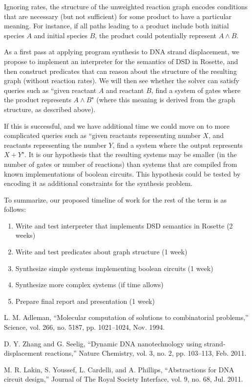 \documentclass{article}
\begin{document}
Ignoring rates, the structure of the unweighted reaction graph encodes
conditions that are necessary (but not sufficient) for some product to have a
particular meaning. For instance, if all paths leading to a product include both
initial species $A$ and initial species $B$, the product could potentially
represent $A \land B$.

As a first pass at applying program synthesis to DNA strand displacement, we
propose to implement an interpreter for the semantics of DSD in Rosette, and
then construct predicates that can reason about the structure of the resulting
graph (without reaction rates). We will then see whether the solver can satisfy
queries such as ``given reactant $A$ and reactant $B$, find a system of gates
where the product represents $A \land B$" (where this meaning is derived from
the graph structure, as described above).

If this is successful, and we have additional time we could move on to more
complicated queries such as ``given reactants representing number $X$, and
reactants representing the number $Y$, find a system where the output represents
$X + Y$".  It is our hypothesis that the resulting systems may be smaller (in
the number of gates or number of reactions) than systems that are compiled from
known implementations of boolean circuits. This hypothesis could be tested by
encoding it as additional constraints for the synthesis problem.

To summarize, our proposed timeline of work for the rest of the term is as
follows:
\begin{enumerate}
\item
Write and test interpreter that implements DSD semantics in Rosette (2
weeks)

\item
Write and test predicates about graph structure (1 week)

\item
Synthesize simple systems implementing boolean circuits (1 week)

\item
Synthesize more complex systems (if time allows)

\item
Prepare final report and presentation (1 week)
\end{enumerate}

\begin{thebibliography}{9}

L. M. Adleman,
“Molecular computation of solutions to combinatorial problems,”
Science, vol. 266, no. 5187, pp. 1021–1024, Nov. 1994.

D. Y. Zhang and G. Seelig,
“Dynamic DNA nanotechnology using strand-displacement reactions,”
Nature Chemistry, vol. 3, no. 2, pp. 103–113, Feb. 2011.

M. R. Lakin, S. Youssef, L. Cardelli, and A. Phillips,
“Abstractions for DNA circuit design,”
Journal of The Royal Society Interface, vol. 9, no. 68, Jul. 2011.

\end{thebibliography}
\end{document}
